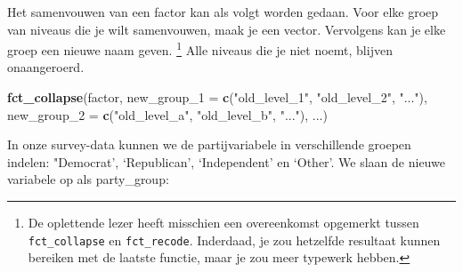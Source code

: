 \documentclass[]{tufte-book}
\newenvironment{Shaded}{}{}
\newcommand{\DataTypeTok}[1]{\textcolor[rgb]{0.56,0.13,0.00}{#1}}
\newcommand{\KeywordTok}[1]{\textcolor[rgb]{0.00,0.44,0.13}{\textbf{#1}}}
\newcommand{\NormalTok}[1]{#1}
\newcommand{\OperatorTok}[1]{\textcolor[rgb]{0.40,0.40,0.40}{#1}}
\newcommand{\StringTok}[1]{\textcolor[rgb]{0.25,0.44,0.63}{#1}}
\begin{document}
Het samenvouwen van een factor kan als volgt worden gedaan. Voor elke groep van niveaus die je wilt samenvouwen, maak je een vector. Vervolgens kan je elke groep een nieuwe naam geven. \footnote{De oplettende lezer heeft misschien een overeenkomst opgemerkt tussen \texttt{fct\_collapse} en \texttt{fct\_recode}. Inderdaad, je zou hetzelfde resultaat kunnen bereiken met de laatste functie, maar je zou meer typewerk hebben.} Alle niveaus die je niet noemt, blijven onaangeroerd.

\begin{Shaded}
\begin{Highlighting}[]
\KeywordTok{fct_collapse}\NormalTok{(factor,}
    \DataTypeTok{new_group_1 =} \KeywordTok{c}\NormalTok{(}\StringTok{"old_level_1"}\NormalTok{, }\StringTok{"old_level_2"}\NormalTok{, }\StringTok{"..."}\NormalTok{),}
    \DataTypeTok{new_group_2 =} \KeywordTok{c}\NormalTok{(}\StringTok{"old_level_a"}\NormalTok{, }\StringTok{"old_level_b"}\NormalTok{, }\StringTok{"..."}\NormalTok{),}
\NormalTok{    ...)}
\end{Highlighting}
\end{Shaded}

In onze survey-data kunnen we de partijvariabele in verschillende groepen indelen: "Democrat', `Republican', `Independent' en `Other'. We slaan de nieuwe variabele op als party\_group:

\begin{Shaded}
\end{Shaded}
\end{document}
